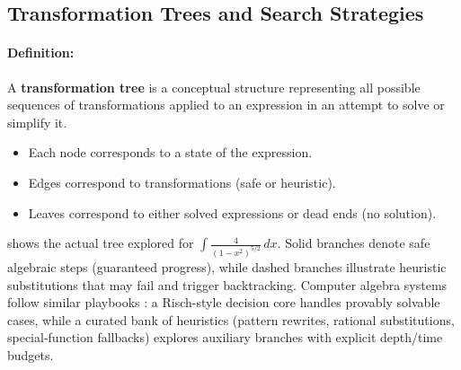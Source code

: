 \subsection{Transformation Trees and Search Strategies}
\label{sec:symbolic_transformation_trees_and_search_strategies}

\paragraph{Definition:} A \textbf{transformation tree} is a conceptual structure representing all possible sequences of transformations applied to an expression in an attempt to solve or simplify it.

\begin{itemize}
  \item Each node corresponds to a state of the expression.
  \item Edges correspond to transformations (safe or heuristic).
  \item Leaves correspond to either solved expressions or dead ends (no solution).
\end{itemize}

 shows the actual tree explored for \(\int \frac{4}{(1-x^2)^{5/2}}\, dx\). Solid branches denote safe algebraic steps (guaranteed progress), while dashed branches illustrate heuristic substitutions that may fail and trigger backtracking. Computer algebra systems follow similar playbooks \citep{Bronstein2005,Risch1969}: a Risch-style decision core handles provably solvable cases, while a curated bank of heuristics (pattern rewrites, rational substitutions, special-function fallbacks) explores auxiliary branches with explicit depth/time budgets.

